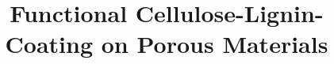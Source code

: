 \documentclass{book}
\numberwithin{equation}{section}
\begin{document}
\frontmatter
\title      {Functional Cellulose-Lignin-Coating on Porous Materials}
\maketitle
\backmatter
\end{document}
